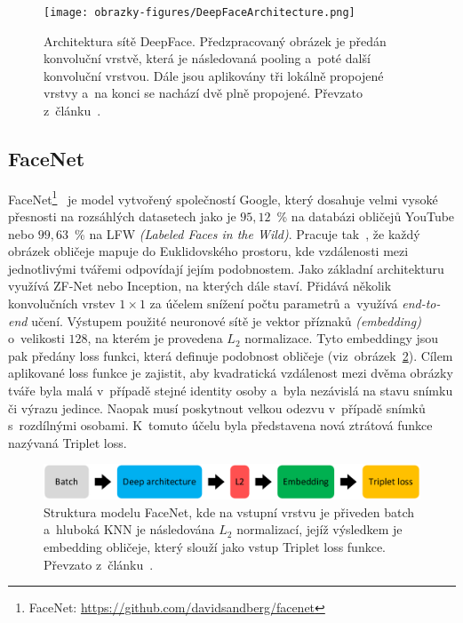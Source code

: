 \begin{figure}[hbt]
	\centering
	\setlength{\fboxsep}{0pt}
	\texttt{[image: obrazky-figures/DeepFaceArchitecture.png]}
	\caption{Architektura sítě DeepFace. Předzpracovaný obrázek je předán konvoluční vrstvě, která je následovaná pooling a~poté další konvoluční vrstvou. Dále jsou aplikovány tři lokálně propojené vrstvy a~na konci se nachází dvě plně propojené. Převzato z~článku~\cite{article:DeepFace}.}
	\label{img:DeepFaceArchitecture}
\end{figure}

\subsection{FaceNet}
FaceNet\footnote{FaceNet: \url{https://github.com/davidsandberg/facenet}}~\cite{article:FaceNet} je model vytvořený společností Google, který dosahuje velmi vysoké přesnosti na rozsáhlých datasetech jako je $95,12$~\% na databázi obličejů YouTube nebo $99,63$~\% na LFW \emph{(Labeled Faces in the Wild)}. Pracuje tak~\cite{website:FaceNetIntro}, že každý obrázek obličeje mapuje do Euklidovského prostoru, kde vzdálenosti mezi jednotlivými tvářemi odpovídají jejím podobnostem. Jako základní architekturu~\cite{website:FaceNet} využívá ZF-Net nebo Inception, na kterých dále staví. Přidává několik konvolučních vrstev $1 \times 1$ za účelem snížení počtu parametrů a~využívá \emph{end-to-end} učení. Výstupem použité neuronové sítě je vektor příznaků \emph{(embedding)} o~velikosti $128$, na kterém je provedena $L_{2}$ normalizace. Tyto embeddingy jsou pak předány loss funkci, která definuje podobnost obličeje (viz~obrázek~\ref{img:FaceNetArchitecture}). Cílem aplikované loss funkce je zajistit, aby kvadratická vzdálenost mezi dvěma obrázky tváře byla malá v~případě stejné identity osoby a~byla nezávislá na stavu snímku či výrazu jedince. Naopak musí poskytnout velkou odezvu v~případě snímků s~rozdílnými osobami. K~tomuto účelu byla představena nová ztrátová funkce nazývaná Triplet loss.

\begin{figure}[hbt]
	\centering
	\setlength{\fboxsep}{0pt}
	\includegraphics[width=1.0\textwidth]{obrazky-figures/FaceNetArchitecture.pdf}
	\caption{Struktura modelu FaceNet, kde na vstupní vrstvu je přiveden batch a~hluboká KNN je následována $L_{2}$ normalizací, jejíž výsledkem je embedding obličeje, který slouží jako vstup Triplet loss funkce. Převzato z~článku~\cite{article:FaceNet}.}
	\label{img:FaceNetArchitecture}
\end{figure}

